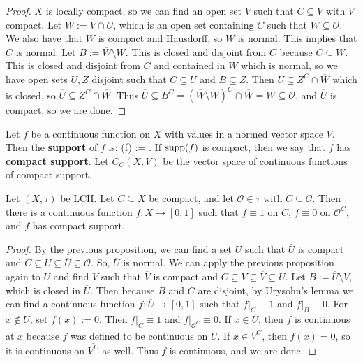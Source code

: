 	\begin{proof}
		$X$ is locally compact, so we can find an open set $V$ such that $C\subseteq V$ with $\overline{V}$ compact. 
		Let $W := V\cap \mathcal O$, which is an open set containing $C$ such that $W\subseteq\mathcal O$.  
		We also have that $\overline W$ is compact and Hausdorff, so $\overline W$ is normal. This implies that 
		$C$ is normal. Let $B := \overline W\setminus W$. This is closed and disjoint from $C$ because $C\subseteq W$. 
		This is closed and disjoint from $C$ and contained in $\overline W$ which is normal, so we have open sets 
		$U, Z$ disjoint such that $C\subseteq U$ and $B\subseteq Z$. Then $U\subseteq Z^C\cap\overline W$ which is 
		closed, so $\overline U\subseteq Z^C\cap\overline W$. Thus $\overline U\subseteq B^C = (\overline W\setminus 
		W)^C\cap\overline W = W\subseteq \mathcal O$, and $\overline U$ is compact, so we are done.
	\end{proof}
	
	\begin{definition}[Support]
		Let $f$ be a continuous function on $X$ with values in a normed vector space $V$. Then the \textbf{support} of $f$ 
		is:
		\eq
			\supp(f) := .
		\qe
		If $\mathrm{supp}(f)$ is compact, then we say that $f$ has \textbf{compact support}. Let $C_C(X, V)$ be the vector space of 
		continuous functions of compact support.
	\end{definition}
	
	\begin{prop}
		Let $(X, \tau)$ be LCH. Let $C\subseteq X$ be compact, and let $\mathcal O\in\tau$ with $C\subseteq\mathcal O$. 
		Then there is a continuous function $f : X\rightarrow [0, 1]$ such that $f\equiv 1$ on $C$, $f\equiv 0$ on $\mathcal
		 O^C$, and $f$ has compact support. 
	\end{prop}
	
	\begin{proof}
		By the previous proposition, we can find a set $U$ such that $\overline U$ is compact and $C\subseteq U\subseteq
		\overline U\subseteq \mathcal O$. So, $\overline U$ is normal. We can apply the previous proposition again 
		to $U$ and find $V$ such that $\overline V$ is compact and $C\subseteq V\subseteq\overline V\subseteq U$. 
		Let $B := \overline U\setminus V$, which is closed in $\overline U$. Then because $B$ and $C$ are disjoint, 
		by Urysohn's lemma we can find a continuous function $f : \overline U\rightarrow [0, 1]$ such that $f|_C\equiv 1$ 
		and $f|_B\equiv 0$. For $x\notin\overline U$, set $f(x) := 0$. Then $f|_C\equiv 1$ and $f|_{\mathcal O^C}\equiv 
		0$. If $x\in U$, then $f$ is continuous at $x$ because $f$ was defined to be continuous on $\overline U$. If 
		$x\in \overline{V^C}$, then $f(x) = 0$, so it is continuous on $\overline{V^C}$ as well. Thus $f$ is continuous, 
		and we are done.
	\end{proof}

